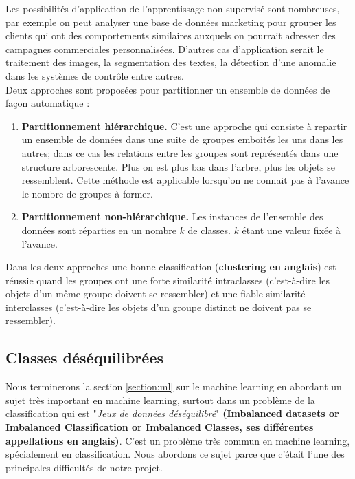 \documentclass[12pt, french]{report}
\begin{document}
 Les possibilités d'application de l'apprentissage non-supervisé sont nombreuses, par exemple on peut analyser une base de données marketing pour grouper les clients qui ont des comportements similaires auxquels on pourrait adresser des campagnes commerciales personnalisées. D'autres cas d'application serait le traitement des images, la segmentation des textes, la détection d'une anomalie dans les systèmes de contrôle entre autres.  \cite{key41, key44}\\
 
 Deux approches sont proposées pour partitionner un ensemble de données de façon automatique :
 \begin{enumerate}
 	\item \textbf{Partitionnement hiérarchique.} C'est une approche qui consiste à repartir un ensemble de données dans une suite de groupes emboités les uns dans les autres; dans ce cas les relations entre les groupes sont représentés dans une structure arborescente. Plus on est plus bas dans l'arbre, plus les objets se ressemblent. Cette méthode est applicable lorsqu'on ne connait pas à l'avance le nombre de groupes à former.
 	\item \textbf{Partitionnement non-hiérarchique.} Les instances de l'ensemble des données sont réparties en un nombre $k$ de classes. $k$ étant une valeur fixée à l'avance. 
 \end{enumerate}  
 
 Dans les deux approches une bonne classification (\textbf{clustering en anglais}) est réussie quand les groupes ont une forte similarité intraclasses (c'est-à-dire les objets d'un même groupe doivent se ressembler) et une fiable similarité interclasses (c'est-à-dire les objets d'un groupe distinct ne doivent pas se ressembler). \cite[p.~86]{key44}


   
\subsection{Classes déséquilibrées} \label{subsec:imbalancedclasses}

Nous terminerons la section \ref{section:ml} sur le machine learning en abordant un sujet très important en machine learning, surtout dans un problème de la classification qui est "\textit{Jeux de données déséquilibré}" \textbf{(Imbalanced datasets or Imbalanced Classification or Imbalanced Classes, ses différentes appellations en anglais)}. C'est un problème très commun en machine learning, spécialement en classification. Nous abordons ce sujet parce que c'était l'une des principales difficultés de notre projet. \\
\end{document}
